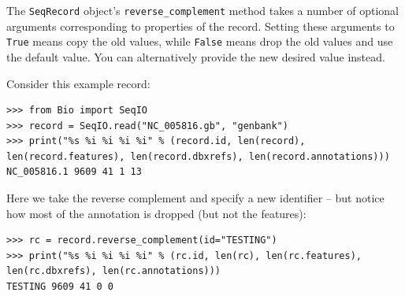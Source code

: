 The \verb|SeqRecord| object's \verb|reverse_complement| method takes a number
of optional arguments corresponding to properties of the record. Setting these
arguments to \verb|True| means copy the old values, while \verb|False| means
drop the old values and use the default value. You can alternatively provide
the new desired value instead.

Consider this example record:

\begin{verbatim}
>>> from Bio import SeqIO
>>> record = SeqIO.read("NC_005816.gb", "genbank")
>>> print("%s %i %i %i %i" % (record.id, len(record), len(record.features), len(record.dbxrefs), len(record.annotations)))
NC_005816.1 9609 41 1 13
\end{verbatim}

Here we take the reverse complement and specify a new identifier -- but notice
how most of the annotation is dropped (but not the features):

\begin{verbatim}
>>> rc = record.reverse_complement(id="TESTING")
>>> print("%s %i %i %i %i" % (rc.id, len(rc), len(rc.features), len(rc.dbxrefs), len(rc.annotations)))
TESTING 9609 41 0 0
\end{verbatim}

